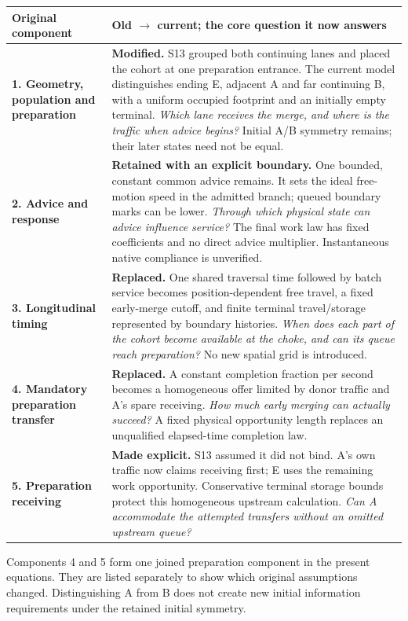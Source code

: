 \documentclass[11pt,a4paper]{article}
\begin{document}
\begin{tabular}{>{\raggedright\arraybackslash}p{31mm}>{\raggedright\arraybackslash}p{119mm}}
\toprule
Original component & Old $\to$ current; the core question it now answers\\
\midrule
\textbf{1. Geometry, population and preparation} &
\textbf{Modified.} S13 grouped both continuing lanes and placed the cohort
at one preparation entrance. The current model distinguishes ending E,
adjacent A and far continuing B, with a uniform occupied footprint and an
initially empty terminal. \emph{Which lane receives the merge, and where is
the traffic when advice begins?} Initial A/B symmetry remains; their later
states need not be equal.\\[7pt]
\textbf{2. Advice and response} &
\textbf{Retained with an explicit boundary.} One bounded, constant common
advice remains. It sets the ideal free-motion speed in the admitted branch;
queued boundary marks can be lower. \emph{Through which physical state can
advice influence service?} The final work law has fixed coefficients and
no direct advice multiplier. Instantaneous native compliance is unverified.\\[7pt]
\textbf{3. Longitudinal timing} &
\textbf{Replaced.} One shared traversal time followed by batch service becomes
position-dependent free travel, a fixed early-merge cutoff, and finite
terminal travel/storage represented by boundary histories. \emph{When does
each part of the cohort become available at the choke, and can its queue
reach preparation?} No new spatial grid is introduced.\\[7pt]
\textbf{4. Mandatory preparation transfer} &
\textbf{Replaced.} A constant completion fraction per second becomes a
homogeneous offer limited by donor traffic and A's spare receiving.
\emph{How much early merging can actually succeed?} A fixed physical
opportunity length replaces an unqualified elapsed-time completion law.\\[7pt]
\textbf{5. Preparation receiving} &
\textbf{Made explicit.} S13 assumed it did not bind. A's own traffic now
claims receiving first; E uses the remaining work opportunity. Conservative
terminal storage bounds protect this homogeneous upstream calculation.
\emph{Can A accommodate the attempted transfers without an omitted
upstream queue?}\\
\bottomrule
\end{tabular}

Components 4 and 5 form one joined preparation component in the present
equations. They are listed separately to show which original assumptions
changed. Distinguishing A from B does not create new initial information
requirements under the retained initial symmetry.
\end{document}
